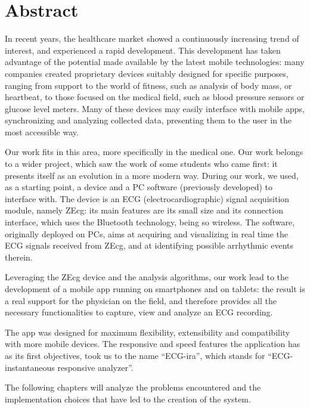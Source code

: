 \chapter{Abstract}

In recent years, the healthcare market showed a continuously increasing trend of interest, and experienced a rapid development. This development has taken advantage of the potential made available by the latest mobile technologies: many companies created proprietary devices suitably designed for specific purposes, ranging from support to the world of fitness, such as analysis of body mass, or heartbeat, to those focused on the medical field, such as blood pressure sensors or glucose level meters. Many of these devices may easily interface with mobile apps, synchronizing and analyzing collected data, presenting them to the user in the most accessible way.

Our work fits in this area, more specifically in the medical one. Our work belongs to a wider project, which saw the work of some students who came first: it presents itself as an evolution in a more modern way. During our work, we used, as a starting point, a device and a PC software (previously developed) to interface with. The device is an ECG (electrocardiographic) signal acquisition module, namely ZEcg: its main features are its small size and its connection interface, which uses the Bluetooth technology, being so wireless.  The software, originally deployed on PCs, aims at acquiring and visualizing in real time the ECG signals received from ZEcg, and at identifying possible arrhythmic events therein.

Leveraging the ZEcg device and the analysis algorithms, our work lead to the development of a mobile app running on smartphones and on tablets: the result is a real support for the physician on the field, and therefore provides all the necessary functionalities to capture, view and analyze an ECG recording.

The app was designed for maximum flexibility, extensibility and compatibility with more mobile devices. The responsive and speed features the application has as its first objectives, took us to the name ``ECG-ira'', which stands for ``ECG-instantaneous responsive analyzer''.

The following chapters will analyze the problems encountered and the implementation choices that have led to the creation of the system.
